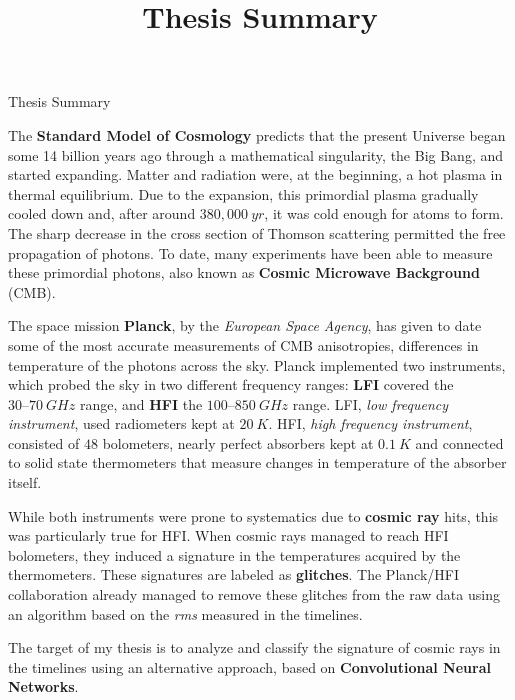 \documentclass[12pt,a4paper,final]{report}			%
\title{Thesis Summary}
\begin{document}
\begin{center}
	\Huge 
	Thesis Summary
\end{center}
\medskip 
		
	The \textbf{Standard Model of Cosmology} predicts that the present Universe began some 14 billion years ago through a mathematical singularity, the Big Bang, and started expanding. Matter and radiation were, at the beginning, a hot plasma in thermal equilibrium. Due to the expansion, this primordial plasma gradually cooled down and, after around $380,000~\unit{yr}$, it was cold enough for atoms to form.  
	The sharp decrease in the cross section of Thomson scattering permitted the free propagation of photons. 
	To date, many experiments have been able to measure these primordial photons, also known as \textbf{Cosmic Microwave Background} (CMB). 
	
	The space mission \textbf{Planck}, by the \textit{European Space Agency}, has given to date some of the most accurate measurements of CMB anisotropies, differences in temperature of the photons across the sky. 
	Planck implemented two instruments, which probed the sky in two different frequency ranges: \textbf{LFI} covered the $30–70~\unit{GHz}$ range, and \textbf{HFI} the $100–850~\unit{GHz}$ range. 
	LFI, \textit{low frequency instrument}, used radiometers kept at $20~\unit{K}$.
	HFI, \textit{high frequency instrument}, consisted of $48$ bolometers, nearly perfect absorbers kept at $0.1~\unit{K}$  and connected to solid state thermometers that measure changes in temperature of the absorber itself.
	
	While both instruments were prone to systematics due to \textbf{cosmic ray }hits, this was particularly true for HFI.
	When cosmic rays managed to reach HFI bolometers, they induced a signature in the temperatures acquired by the thermometers. These signatures are labeled as \textbf{glitches}. 
	The Planck/HFI collaboration already managed to remove these glitches from the raw data using an algorithm based on the \textit{rms} measured in the timelines. 
	
	The target of my thesis is to analyze and classify the signature of cosmic rays in the timelines using an alternative approach, based on \textbf{Convolutional Neural Networks}.
	
\end{document}
